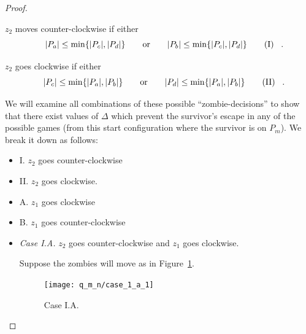 \begin{proof}
\begin{proofpart}
  $z_2$ moves counter-clockwise if either
   \[ |P_a| \leq \min \{ |P_c|, |P_d| \}\qquad \text{or} \qquad |P_b| \leq \min \{ |P_c|, |P_d| \} \tag{I} \label{assumption i} \mperiod \]

  $z_2$ goes clockwise if either
   \[ |P_c| \leq \min \{ |P_a|, |P_b| \}\qquad \text{or} \qquad |P_d| \leq \min \{ |P_a|, |P_b| \} \tag{II} \label{assumption ii}\mperiod \]

  We will examine all combinations of these possible ``zombie-decisions'' to show that there exist values of $\Delta$ which prevent the survivor's escape in any of the possible games (from this start configuration where the survivor is on $P_m$). We break it down as follows:

  \begin{itemize}
   \item I. $z_2$ goes counter-clockwise
   \item II. $z_2$ goes clockwise.
   \item A. $z_1$ goes clockwise
   \item B. $z_1$ goes counter-clockwise
  \end{itemize}

\begin{itemize}
  \item \textit{Case I.A.} $z_2$ goes counter-clockwise and $z_1$ goes clockwise.

  Suppose the zombies will move as in Figure~\ref{fig:case_1_a_1}.
  \begin{figure}
    \centering
    \texttt{[image: q\_m\_n/case\_1\_a\_1]}
    \caption{Case I.A. \label{fig:case_1_a_1}}
  \end{figure}


\end{itemize}
\end{proofpart}
\end{proof}
